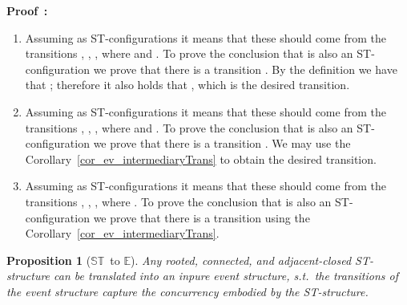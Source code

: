 \documentclass[submission,copyright,creativecommons]{eptcs}
\newtheorem{proposition}[theorem]{Proposition}
\newenvironment{proof}[1][\!\!\,]{\vspace{1ex}\noindent\textbf{Proof #1: }}{\hfill\vspace{2ex}}
\newcommand\allST{\ensuremath{\mathbb{ST}}}
\newcommand\allEv{\ensuremath{\mathbb{E}}}
\begin{document}
\begin{proof}
\begin{enumerate}
\item Assuming  as ST-configurations it means that these should come from the transitions , , , where  and . To prove the conclusion that  is also an ST-configuration we prove that there is a transition . By the definition we have that ; therefore it also holds that , which is the desired transition.

\item Assuming  as ST-configurations it means that these should come from the transitions , , , where  and . To prove the conclusion that  is also an ST-configuration we prove that there is a transition . 
We may use the Corollary~\ref{cor_ev_intermediaryTrans} to obtain the desired transition.

\item Assuming  as ST-configurations it means that these should come from the transitions , , , where . To prove the conclusion that  is also an ST-configuration we prove that there is a transition  using the Corollary~\ref{cor_ev_intermediaryTrans}.
\end{enumerate}
\end{proof}



\begin{proposition}[\allST\ to \allEv]\label{prop_st_to_ev}
Any rooted, connected, and adjacent-closed ST-structure can be translated into an inpure event structure, s.t.\ the transitions of the event structure capture the concurrency embodied by the ST-structure.
\end{proposition}
\end{document}
